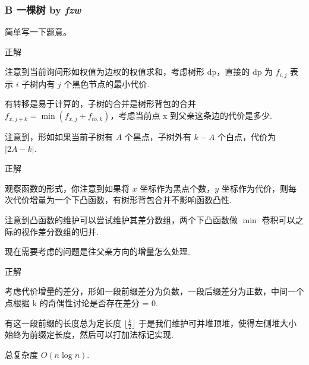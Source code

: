 \frame
{
  \frametitle{B 一棵树 {by \itshape fzw}}

  简单写一下题意。
}

\begin{frame}{正解}

	注意到当前询问形如权值为边权的权值求和，考虑树形 dp，直接的 dp 为 $f_{i,j}$ 表示 $i$ 子树内有 $j$ 个黑色节点的最小代价. \pause

	有转移是易于计算的，子树的合并是树形背包的合并 $f_{x,j+k}=\min(f_{x,j}+f_{to,k})$，考虑当前点 x 到父亲这条边的代价是多少. \pause

	注意到，形如如果当前子树有 $A$ 个黑点，子树外有 $k-A$ 个白点，代价为 $|2A-k|$.

\end{frame}

\begin{frame}{正解}

	观察函数的形式，你注意到如果将 $x$ 坐标作为黑点个数，$y$ 坐标作为代价，则每次代价增量为一个下凸函数，有树形背包合并不影响函数凸性. \pause

	注意到凸函数的维护可以尝试维护其差分数组，两个下凸函数做 $\min$ 卷积可以之际的视作差分数组的归并. \pause

	现在需要考虑的问题是往父亲方向的增量怎么处理.

\end{frame}

\begin{frame}{正解}

	考虑代价增量的差分，形如一段前缀差分为负数，一段后缀差分为正数，中间一个点根据 k 的奇偶性讨论是否存在差分 = 0. \pause

	有这一段前缀的长度总为定长度 $\lfloor \frac k 2 \rfloor$ 于是我们维护可并堆顶堆，使得左侧堆大小始终为前缀定长度，然后可以打加法标记实现. \pause

	总复杂度 $O(n\log n)$.

\end{frame}
